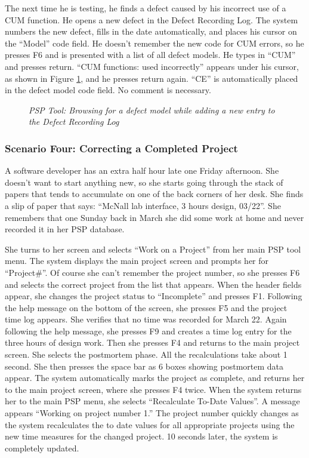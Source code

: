 The next time he is testing, he finds a defect caused by his incorrect use
of a CUM function.  He opens a new defect in the Defect Recording Log.  The
system numbers the new defect, fills in the date automatically, and places
his cursor on the ``Model'' code field.  He doesn't remember the new code
for CUM errors, so he presses F6 and is presented with a list of all defect
models.  He types in ``CUM'' and presses return.  ``CUM functions: used
incorrectly'' appears under his cursor, as shown in Figure
\ref{fig:toolSample3}, and he presses return again.  ``CE'' is
automatically placed in the defect model code field.  No comment is
necessary.

\begin{figure} [htb]
    {\centerline{}}
    \caption[PSP Tool: Defect Recording Log]{\label{fig:toolSample3}
    {\em PSP Tool: Browsing for a defect model while adding a new entry to the Defect Recording Log}}
\end{figure}

\subsubsection{Scenario Four: Correcting a Completed Project}
A software developer has an extra half hour late one Friday afternoon.  She
doesn't want to start anything new, so she starts going through the stack
of papers that tends to accumulate on one of the back corners of her desk.
She finds a slip of paper that says: ``McNall lab interface, 3 hours design,
03/22''.  She remembers that one Sunday back in March she did some work at
home and never recorded it in her PSP database.  

She turns to her screen and selects ``Work on a Project'' from her main PSP
tool menu.  The system displays the main project screen and prompts her for
``Project\#''.  Of course she can't remember the project number, so she
presses F6 and selects the correct project from the list that appears.
When the header fields appear, she changes the project status to
``Incomplete'' and presses F1.  Following the help message on the bottom of
the screen, she presses F5 and the project time log appears.  She verifies
that no time was recorded for March 22.  Again following the help message,
she presses F9 and creates a time log entry for the three hours of design
work.  Then she presses F4 and returns to the main project screen.  She
selects the postmortem phase.  All the recalculations take about 1 second.
She then presses the space bar as 6 boxes showing postmortem data appear.
The system automatically marks the project as complete, and returns her to
the main project screen, where she presses F4 twice.  When the system
returns her to the main PSP menu, she selects ``Recalculate To-Date
Values''.  A message appears ``Working on project number 1.''  The project
number quickly changes as the system recalculates the to date values for
all appropriate projects using the new time measures for the changed
project.  10 seconds later, the system is completely updated.

